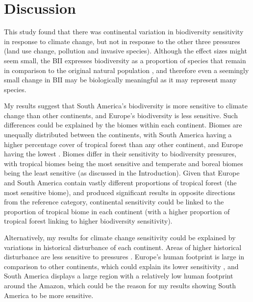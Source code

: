 \documentclass[11pt, a4paper, titlepage]{article}
\begin{document}
    \clearpage
    
     \section*{Discussion}
     This study found that there was continental variation in biodiversity sensitivity in response to climate change, but not in response to the other three pressures (land use change, pollution and invasive species). Although the effect sizes might seem small, the BII expresses biodiversity as a proportion of species that remain in comparison to the original natural population \citep{phillips2021}, and therefore even a seemingly small change in BII may be biologically meaningful as it may represent many species.

	My results suggest that South America's biodiversity is more sensitive to climate change than other continents, and Europe's biodiversity is less sensitive. Such differences could be explained by the biomes within each continent. Biomes are unequally distributed between the continents, with South America having a higher percentage cover of tropical forest than any other continent, and Europe having the lowest \citep{wade2003distribution}. Biomes differ in their sensitivity to biodiversity pressures, with tropical biomes being the most sensitive and temperate and boreal biomes being the least sensitive (as discussed in the Introduction). Given that Europe and South America contain vastly different proportions of tropical forest (the most sensitive biome), and produced significant results in opposite directions from the reference category, continental sensitivity could be linked to the proportion of tropical biome in each continent (with a higher proportion of tropical forest linking to higher biodiversity sensitivity).
	
    Alternatively, my results for climate change sensitivity could be explained by variations in historical disturbance of each continent. Areas of higher historical disturbance are less sensitive to pressures \citep{newbold2020tropical, willmer2022global}. Europe's human footprint is large in comparison to other continents, which could explain its lower sensitivity \citep{venter2016sixteen}, and South America displays a large region with a relatively low human footprint around the Amazon, which could be the reason for my results showing South America to be more sensitive.
     
\end{document}
